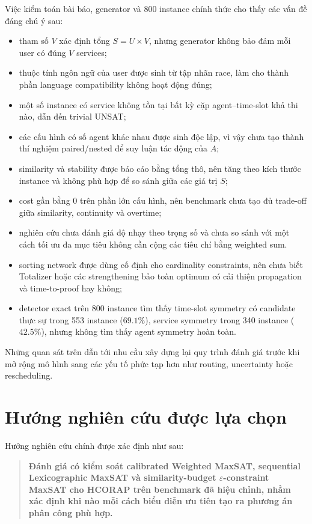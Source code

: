 \documentclass[12pt,a4paper]{article}
\begin{document}
Việc kiểm toán bài báo, generator và 800 instance chính thức cho thấy các vấn
đề đáng chú ý sau:
\begin{itemize}
  \item tham số $V$ xác định tổng $S=U\times V$, nhưng generator không bảo đảm
        mỗi user có đúng $V$ services;
  \item thuộc tính ngôn ngữ của user được sinh từ tập nhãn race, làm cho thành
        phần language compatibility không hoạt động đúng;
  \item một số instance có service không tồn tại bất kỳ cặp agent--time-slot
        khả thi nào, dẫn đến trivial UNSAT;
  \item các cấu hình có số agent khác nhau được sinh độc lập, vì vậy chưa tạo
        thành thí nghiệm paired/nested để suy luận tác động của $A$;
  \item similarity và stability được báo cáo bằng tổng thô, nên tăng theo kích
        thước instance và không phù hợp để so sánh giữa các giá trị $S$;
  \item cost gần bằng 0 trên phần lớn cấu hình, nên benchmark chưa tạo đủ
        trade-off giữa similarity, continuity và overtime;
  \item nghiên cứu chưa đánh giá độ nhạy theo trọng số và chưa so sánh với một
        cách tối ưu đa mục tiêu không cần cộng các tiêu chí bằng weighted sum.
  \item sorting network được dùng cố định cho cardinality constraints, nên chưa
        biết Totalizer hoặc các strengthening bảo toàn optimum có cải thiện
        propagation và time-to-proof hay không;
  \item detector exact trên 800 instance tìm thấy time-slot symmetry có candidate
        thực sự trong 553 instance ($69.1\%$), service symmetry trong 340 instance
        ($42.5\%$), nhưng không tìm thấy agent symmetry hoàn toàn.
\end{itemize}

Những quan sát trên dẫn tới nhu cầu xây dựng lại quy trình đánh giá trước khi
mở rộng mô hình sang các yếu tố phức tạp hơn như routing, uncertainty hoặc
rescheduling.

\section{Hướng nghiên cứu được lựa chọn}

Hướng nghiên cứu chính được xác định như sau:

\begin{quote}
\textbf{Đánh giá có kiểm soát calibrated Weighted MaxSAT, sequential
Lexicographic MaxSAT và similarity-budget $\varepsilon$-constraint MaxSAT cho
HCORAP trên benchmark đã hiệu chỉnh, nhằm xác định khi nào mỗi cách biểu diễn
ưu tiên tạo ra phương án phân công phù hợp.}
\end{quote}
\end{document}
